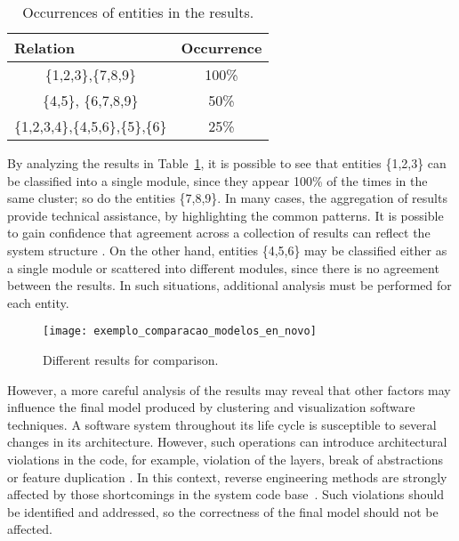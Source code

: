 \begin{table}[h]
	\centering
	\caption{Occurrences of entities in the results.}
	\label{ocorrencias_1}
	\begin{tabular}{|cc|}
		\hline
		\multicolumn{1}{|l}{Relation} & \multicolumn{1}{l|}{Occurrence} \\ \hline
		\{1,2,3\},\{7,8,9\}                  & 100\%                           \\ \hline
		\{4,5\}, \{6,7,8,9\}                    & 50\%                          \\ \hline
		\{1,2,3,4\},\{4,5,6\},\{5\},\{6\}                  & 25\%           \\ \hline
	\end{tabular}
\end{table}

By analyzing the results in Table~\ref{ocorrencias_1}, it is possible to see that entities \{1,2,3\} can be classified into a single module, since they appear 100\% of the times in the same cluster; so do the entities \{7,8,9\}. In many cases, the aggregation of results provide technical assistance, by highlighting the common patterns. It is possible to gain confidence that agreement across a collection of results can reflect the system structure \cite{craft}. On the other hand, entities \{4,5,6\} may be classified either as a single module or scattered into different modules, since there is no agreement between the results. In such situations, additional analysis must be performed for each entity. 

\begin{figure}[!h]
	\centering
	\texttt{[image: exemplo\_comparacao\_modelos\_en\_novo]}
	\caption{Different results for comparison.}
	\label{exemplo_comparacao_modelos}
\end{figure}

However, a more careful analysis of the results may reveal that other factors may influence the final model produced by clustering and visualization software techniques. A software system throughout its life cycle is susceptible to several changes in its architecture. However, such operations can introduce architectural violations in the code, for example, violation of the layers, break of abstractions or feature duplication \cite{kazman_view_1998}. In this context, reverse engineering methods are strongly affected by those shortcomings in the system code base~\cite{Platenius_2012}.  Such violations should be identified and addressed, so the correctness of the final model should not be affected.

